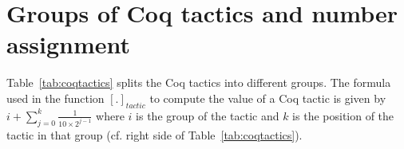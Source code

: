 \newpage

\section{Groups of Coq tactics and number assignment}\label{sec:coqtactics}


Table~\ref{tab:coqtactics} splits the Coq tactics into different groups. The formula used in the function $[.]_{tactic}$ 
to compute the value of a Coq tactic is given by 
$i+\sum_{j=0}^k\frac{1}{10 \times 2^{j-1}}$ where $i$ is the group of the tactic and $k$ is the position 
of the tactic in that group (cf. right side of Table~\ref{tab:coqtactics}). 

\begin{table}[h]
\end{table}

